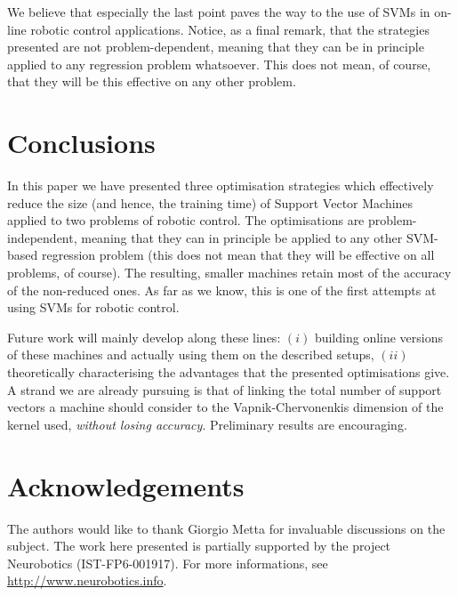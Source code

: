 \documentclass[conference]{IEEEtran}
\begin{document}
We believe that especially the last point paves the way to the use of
SVMs in on-line robotic control applications. Notice, as a final
remark, that the strategies presented are not problem-dependent,
meaning that they can be in principle applied to any regression
problem whatsoever. This does not mean, of course, that they will be
this effective on any other problem.

\section{Conclusions}
\label{sec:concl}

In this paper we have presented three optimisation strategies which
effectively reduce the size (and hence, the training time) of Support
Vector Machines applied to two problems of robotic control. The
optimisations are problem-independent, meaning that they can in
principle be applied to any other SVM-based regression problem (this
does not mean that they will be effective on all problems, of
course). The resulting, smaller machines retain most of the accuracy
of the non-reduced ones. As far as we know, this is one of the first
attempts at using SVMs for robotic control.

Future work will mainly develop along these lines: $(i)$ building
online versions of these machines and actually using them on the
described setups, $(ii)$ theoretically characterising the advantages
that the presented optimisations give. A strand we are already
pursuing is that of linking the total number of support vectors a
machine should consider to the Vapnik-Chervonenkis dimension of the
kernel used, \emph{without losing accuracy}. Preliminary results are
encouraging.

\section*{Acknowledgements}

The authors would like to thank Giorgio Metta for invaluable
discussions on the subject. The work here presented is partially
supported by the project Neurobotics (IST-FP6-001917). For more
informations, see \url{http://www.neurobotics.info}.



\end{document}
